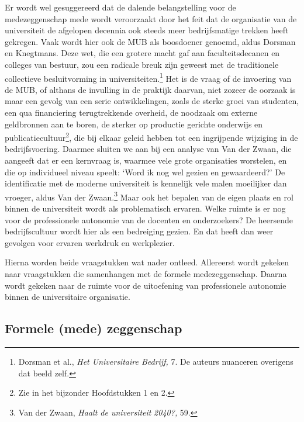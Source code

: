 \documentclass[smallauthor, chapterhaspagenum, nochapterinheader, pagenuminheader,  bigchapnum,medium2, tocpages, garamond, titleinheader]{jote-book}
\begin{document}
	Er wordt wel gesuggereerd dat de dalende belangstelling voor de medezeggenschap mede wordt veroorzaakt door het feit dat de organisatie van de universiteit de afgelopen decennia ook steeds meer bedrijfsmatige trekken heeft gekregen. Vaak wordt hier ook de MUB als boosdoener genoemd, aldus Dorsman en Knegtmans. Deze wet, die een grotere macht gaf aan faculteitsdecanen en colleges van bestuur, zou een radicale breuk zijn geweest met de traditionele collectieve besluitvorming in universiteiten.\footnote{Dorsman et al., \emph{Het Universitaire Bedrij}\emph{f, }7. De auteurs nuanceren overigens dat beeld zelf.} Het is de vraag of de invoering van de MUB, of althans de invulling in de praktijk daarvan, niet zozeer de oorzaak is maar een gevolg van een serie ontwikkelingen, zoals de sterke groei van studenten, een qua financiering terugtrekkende overheid, de noodzaak om externe geldbronnen aan te boren, de sterker op productie gerichte onderwijs en publicatiecultuur\footnote{Zie in het bijzonder Hoofdstukken 1 en 2.}, die bij elkaar geleid hebben tot een ingrijpende wijziging in de bedrijfsvoering. Daarmee sluiten we aan bij een analyse van Van der Zwaan, die aangeeft dat er een kernvraag is, waarmee vele grote organisaties worstelen, en die op individueel niveau speelt: ‘Word ik nog wel gezien en gewaardeerd?' De identificatie met de moderne universiteit is kennelijk vele malen moeilijker dan vroeger, aldus Van der Zwaan.\footnote{Van der Zwaan, \emph{Haalt de universiteit }\emph{2040?,} 59.} Maar ook het bepalen van de eigen plaats en rol binnen de universiteit wordt als problematisch ervaren. Welke ruimte is er nog voor de professionele autonomie van de docenten en onderzoekers? De heersende bedrijfscultuur wordt hier als een bedreiging gezien. En dat heeft dan weer gevolgen voor ervaren werkdruk en werkplezier.



	Hierna worden beide vraagstukken wat nader ontleed. Allereerst wordt gekeken naar vraagstukken die samenhangen met de formele medezeggenschap. Daarna wordt gekeken naar de ruimte voor de uitoefening van professionele autonomie binnen de universitaire organisatie.



	\subsection{Formele (mede) zeggenschap}
\end{document}
